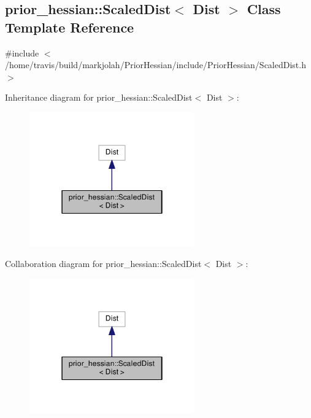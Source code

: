 \hypertarget{classprior__hessian_1_1ScaledDist}{}\subsection{prior\+\_\+hessian\+:\+:Scaled\+Dist$<$ Dist $>$ Class Template Reference}
\label{classprior__hessian_1_1ScaledDist}


{\ttfamily \#include $<$/home/travis/build/markjolah/\+Prior\+Hessian/include/\+Prior\+Hessian/\+Scaled\+Dist.\+h$>$}



Inheritance diagram for prior\+\_\+hessian\+:\+:Scaled\+Dist$<$ Dist $>$\+:\nopagebreak
\begin{figure}[H]
\begin{center}
\leavevmode
\includegraphics[width=202pt]{classprior__hessian_1_1ScaledDist__inherit__graph}
\end{center}
\end{figure}


Collaboration diagram for prior\+\_\+hessian\+:\+:Scaled\+Dist$<$ Dist $>$\+:\nopagebreak
\begin{figure}[H]
\begin{center}
\leavevmode
\includegraphics[width=202pt]{classprior__hessian_1_1ScaledDist__coll__graph}
\end{center}
\end{figure}
